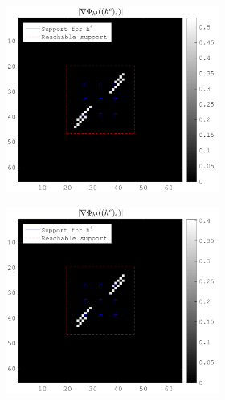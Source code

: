 \begin{figure}[!h]
\begin{subfigure}[b]{0.49\textwidth}
\begin{subfigure}[b]{0.49\textwidth}
	\end{subfigure}
	\begin{subfigure}[b]{0.49\textwidth}\centering
	\includegraphics[width=\textwidth]{figures/xp_grad_iterations/xp_128x128_sc2_angl1_K3_S3_node4_8thiteration_partgrad4_bestvalues}
	\end{subfigure}
	\begin{subfigure}[b]{0.49\textwidth}\centering
	\includegraphics[width=\textwidth]{figures/xp_grad_iterations/xp_128x128_sc2_angl1_K3_S3_node4_20thiteration_partgrad4_bestvalues}

\end{subfigure}
\end{subfigure}
\end{figure}
